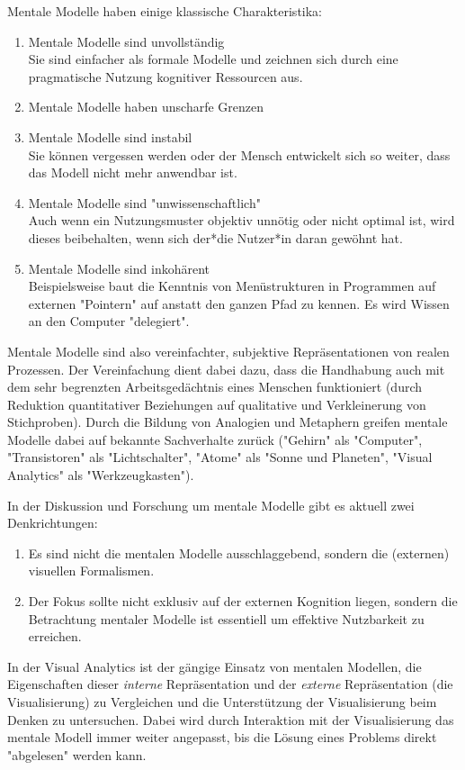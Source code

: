 		Mentale Modelle haben einige klassische Charakteristika:
		\begin{enumerate}
			\item Mentale Modelle sind unvollständig \\
				Sie sind einfacher als formale Modelle und zeichnen sich durch eine pragmatische Nutzung kognitiver Ressourcen aus.
			\item Mentale Modelle haben unscharfe Grenzen
			\item Mentale Modelle sind instabil \\
				Sie können vergessen werden oder der Mensch entwickelt sich so weiter, dass das Modell nicht mehr anwendbar ist.
			\item Mentale Modelle sind "unwissenschaftlich" \\
				Auch wenn ein Nutzungsmuster objektiv unnötig oder nicht optimal ist, wird dieses beibehalten, wenn sich der*die Nutzer*in daran gewöhnt hat.
			\item Mentale Modelle sind inkohärent \\
				Beispielsweise baut die Kenntnis von Menüstrukturen in Programmen auf externen "Pointern" auf anstatt den ganzen Pfad zu kennen. Es wird Wissen an den Computer "delegiert".
		\end{enumerate}
		Mentale Modelle sind also vereinfachter, subjektive Repräsentationen von realen Prozessen. Der Vereinfachung dient dabei dazu, dass die Handhabung auch mit dem sehr begrenzten Arbeitsgedächtnis eines Menschen funktioniert (\zB durch Reduktion quantitativer Beziehungen auf qualitative und Verkleinerung von Stichproben). Durch die Bildung von Analogien und Metaphern greifen mentale Modelle dabei auf bekannte Sachverhalte zurück (\zB "Gehirn" als "Computer", "Transistoren" als "Lichtschalter", "Atome" als "Sonne und Planeten", "Visual Analytics" als "Werkzeugkasten").

		In der Diskussion und Forschung um mentale Modelle gibt es aktuell zwei Denkrichtungen:
		\begin{enumerate}
			\item Es sind nicht die mentalen Modelle ausschlaggebend, sondern die (externen) visuellen Formalismen.
			\item Der Fokus sollte nicht exklusiv auf der externen Kognition liegen, sondern die Betrachtung mentaler Modelle ist essentiell um effektive Nutzbarkeit zu erreichen.
		\end{enumerate}
		In der Visual Analytics ist der gängige Einsatz von mentalen Modellen, die Eigenschaften dieser \emph{interne} Repräsentation und der \emph{externe} Repräsentation (die Visualisierung) zu Vergleichen und die Unterstützung der Visualisierung beim Denken zu untersuchen. Dabei wird durch Interaktion mit der Visualisierung das mentale Modell immer weiter angepasst, bis die Lösung eines Problems direkt "abgelesen" werden kann.

